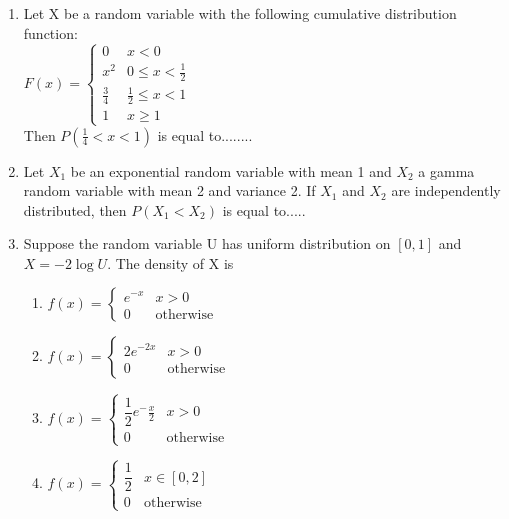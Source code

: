 \begin{enumerate}[label=\thesection.\arabic*.,ref=\thesection.\theenumi]
\item Let X be a random variable with the following cumulative distribution function: \\

$
F(x)= 
\begin{cases}
0 & x<0 \\
x^2 & 0 \leqslant x < \frac{1}{2} \\
\frac{3}{4} & \frac{1}{2} \leqslant x < 1 \\
1 & x \geqslant 1
\end{cases}
$ \\

Then $P({\frac{1}{4}}<x<1)$ is equal to........
\\
\solution


\item Let $X_1$ be an exponential random variable with mean 1 and $X_2$ a gamma random variable with mean 2 and variance 2. If $X_1$ and $X_2$ are independently distributed, then $P(X_1<X_2)$ is equal to.....

\item Suppose the random variable U has uniform distribution on $[0,1]$ and $X= -2 \log U$. The density of X is \\

\begin{enumerate}
\setlength\itemsep{2em}

\item $
f(x)=
\begin{cases}
e^{-x} &  x>0\\
0 & \text{otherwise}
\end{cases}
$

\item $
f(x)=
\begin{cases}
2e^{-2x} &  x>0 \\
0 & \text{otherwise}
\end{cases}
$

\item $
f(x)=
\begin{cases}
\dfrac{1}{2}e^-{\frac{x}{2}} &  x>0 \\
0 & \text{otherwise}
\end{cases}
$

\item $
f(x)=
\begin{cases}
\dfrac{1}{2} &  x \in [0,2] \\
0 & \text{otherwise}
\end{cases}
$


\end{enumerate}
\end{enumerate}
